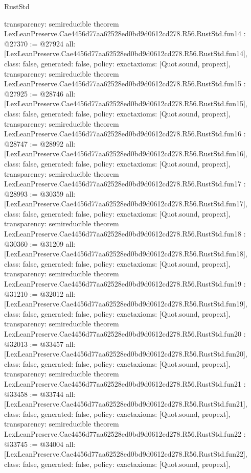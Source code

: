 \begin{lexlean}{RustStd}
\begin{coremodule}
{  transparency: semireducible
}
theorem LexLeanPreserve.Cae4456d77aa62528ed0bd9d0612cd278.R56.RustStd.fun14 : @27370 := @27924 {
  all: [LexLeanPreserve.Cae4456d77aa62528ed0bd9d0612cd278.R56.RustStd.fun14],
  class: false,
  generated: false,
  policy: exact{axioms: [Quot.sound, propext]},
  transparency: semireducible
}
theorem LexLeanPreserve.Cae4456d77aa62528ed0bd9d0612cd278.R56.RustStd.fun15 : @27925 := @28746 {
  all: [LexLeanPreserve.Cae4456d77aa62528ed0bd9d0612cd278.R56.RustStd.fun15],
  class: false,
  generated: false,
  policy: exact{axioms: [Quot.sound, propext]},
  transparency: semireducible
}
theorem LexLeanPreserve.Cae4456d77aa62528ed0bd9d0612cd278.R56.RustStd.fun16 : @28747 := @28992 {
  all: [LexLeanPreserve.Cae4456d77aa62528ed0bd9d0612cd278.R56.RustStd.fun16],
  class: false,
  generated: false,
  policy: exact{axioms: [Quot.sound, propext]},
  transparency: semireducible
}
theorem LexLeanPreserve.Cae4456d77aa62528ed0bd9d0612cd278.R56.RustStd.fun17 : @28993 := @30359 {
  all: [LexLeanPreserve.Cae4456d77aa62528ed0bd9d0612cd278.R56.RustStd.fun17],
  class: false,
  generated: false,
  policy: exact{axioms: [Quot.sound, propext]},
  transparency: semireducible
}
theorem LexLeanPreserve.Cae4456d77aa62528ed0bd9d0612cd278.R56.RustStd.fun18 : @30360 := @31209 {
  all: [LexLeanPreserve.Cae4456d77aa62528ed0bd9d0612cd278.R56.RustStd.fun18],
  class: false,
  generated: false,
  policy: exact{axioms: [Quot.sound, propext]},
  transparency: semireducible
}
theorem LexLeanPreserve.Cae4456d77aa62528ed0bd9d0612cd278.R56.RustStd.fun19 : @31210 := @32012 {
  all: [LexLeanPreserve.Cae4456d77aa62528ed0bd9d0612cd278.R56.RustStd.fun19],
  class: false,
  generated: false,
  policy: exact{axioms: [Quot.sound, propext]},
  transparency: semireducible
}
theorem LexLeanPreserve.Cae4456d77aa62528ed0bd9d0612cd278.R56.RustStd.fun20 : @32013 := @33457 {
  all: [LexLeanPreserve.Cae4456d77aa62528ed0bd9d0612cd278.R56.RustStd.fun20],
  class: false,
  generated: false,
  policy: exact{axioms: [Quot.sound, propext]},
  transparency: semireducible
}
theorem LexLeanPreserve.Cae4456d77aa62528ed0bd9d0612cd278.R56.RustStd.fun21 : @33458 := @33744 {
  all: [LexLeanPreserve.Cae4456d77aa62528ed0bd9d0612cd278.R56.RustStd.fun21],
  class: false,
  generated: false,
  policy: exact{axioms: [Quot.sound, propext]},
  transparency: semireducible
}
theorem LexLeanPreserve.Cae4456d77aa62528ed0bd9d0612cd278.R56.RustStd.fun22 : @33745 := @34004 {
  all: [LexLeanPreserve.Cae4456d77aa62528ed0bd9d0612cd278.R56.RustStd.fun22],
  class: false,
  generated: false,
  policy: exact{axioms: [Quot.sound, propext]},
}
\end{coremodule}
\end{lexlean}
